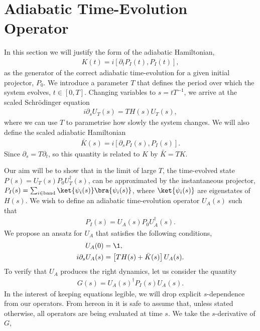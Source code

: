 \section{Adiabatic Time-Evolution Operator}\label{sec:kato_appendix}

In this section we will justify the form of the adiabatic Hamiltonian,
\begin{align}
    K(t) = i\left[ \partial_t P_I(t), P_I(t) \right],
\end{align}
as the generator of the correct adiabatic time-evolution for a given initial projector, $P_0$. We introduce a parameter $T$ that defines the period over which the system evolves, $t \in [0,T]$. Changing variables to $s = tT^{-1}$, we arrive at the scaled Schr\"odinger equation
\begin{align}\label{eqn:scaled_schrodinger}
    i \partial_s U_T(s) = TH(s) U_T(s),
\end{align}
where we can use $T$ to parametrise how slowly the system changes. We will also define the scaled adiabatic Hamiltonian
\begin{align}
    \bar K(s) = i[\partial_s P_I(s), P_I(s)].
\end{align}
Since $\partial_s = T \partial_t$, so this quantity is related to $K$ by $\bar K = T K$.\par  
Our aim will be to show that in the limit of large $T$, the time-evolved state $P(s) = U_T(s) P_0 U^{\dag}_T(s)$, can be approximated by the instantaneous projector, $P_I(s) = \sum_{i \in \textup{band}} \ket{\psi_i(s)} \bra{\psi_i(s)}$, where $\ket{\psi_i(s)}$ are eigenstates of $H(s)$. We wish to define an adiabatic time-evolution operator $U_A(s)$ such that
\begin{align}\label{eqn:U_A_def}
     P_I(s) = U_A(s) P_0 U_A^\dag(s).
\end{align}
We propose an ansatz for $U_A$ that satisfies the following conditions,
\begin{align}
    U_A(0) &= \1, \\
    i \partial_s U_A(s) &= \left [ TH(s) + \bar K(s) \right ] U_A(s).
\end{align}
To verify that $ U_A$ produces the right dynamics, let us consider the quantity
\begin{align}
    G(s) =  U_A(s)^\dag P_I(s) U_A(s).
\end{align}
In the interest of keeping equations legible, we will drop explicit $s$-dependence from our operators. From hereon in it is safe to assume that, unless stated otherwise, all operators are being evaluated at time $s$. We take the $s$-derivative of $ G$,

